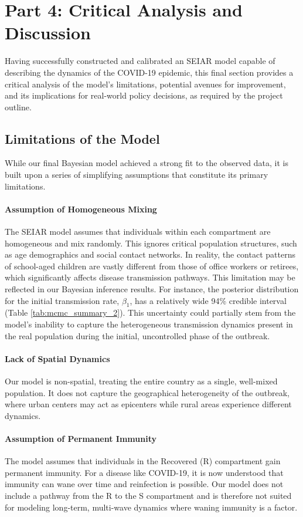 \documentclass[12pt, a4paper]{article}
\begin{document}
\section{Part 4: Critical Analysis and Discussion}
Having successfully constructed and calibrated an SEIAR model capable of describing the dynamics of the COVID-19 epidemic, this final section provides a critical analysis of the model's limitations, potential avenues for improvement, and its implications for real-world policy decisions, as required by the project outline.

\subsection{Limitations of the Model}
While our final Bayesian model achieved a strong fit to the observed data, it is built upon a series of simplifying assumptions that constitute its primary limitations.

\paragraph{Assumption of Homogeneous Mixing} The SEIAR model assumes that individuals within each compartment are homogeneous and mix randomly. This ignores critical population structures, such as age demographics and social contact networks. In reality, the contact patterns of school-aged children are vastly different from those of office workers or retirees, which significantly affects disease transmission pathways. This limitation may be reflected in our Bayesian inference results. For instance, the posterior distribution for the initial transmission rate, $\beta_1$, has a relatively wide 94\% credible interval (Table \ref{tab:mcmc_summary_2}). This uncertainty could partially stem from the model's inability to capture the heterogeneous transmission dynamics present in the real population during the initial, uncontrolled phase of the outbreak.

\paragraph{Lack of Spatial Dynamics} Our model is non-spatial, treating the entire country as a single, well-mixed population. It does not capture the geographical heterogeneity of the outbreak, where urban centers may act as epicenters while rural areas experience different dynamics.

\paragraph{Assumption of Permanent Immunity} The model assumes that individuals in the Recovered (R) compartment gain permanent immunity. For a disease like COVID-19, it is now understood that immunity can wane over time and reinfection is possible. Our model does not include a pathway from the R to the S compartment and is therefore not suited for modeling long-term, multi-wave dynamics where waning immunity is a factor.
\end{document}
